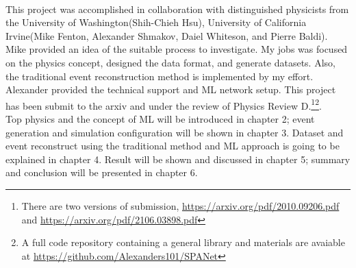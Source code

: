 \\
This project was accomplished in collaboration with distinguished physicists from the University of Washington(Shih-Chieh Hsu), University of California Irvine(Mike Fenton, Alexander Shmakov, Daiel Whiteson, and Pierre Baldi). Mike provided an idea of the suitable process to investigate.  My jobs was focused on the physics concept, designed the data format, and generate datasets. Also, the traditional event reconstruction method is implemented by my effort. Alexander provided the technical support and ML network setup. This project has been submit to the arxiv and under the review of Physics Review D.\footnote{There are two versions of submission, \hyperlink{https://arxiv.org/pdf/2010.09206.pdf}{https://arxiv.org/pdf/2010.09206.pdf} and \hyperlink{https://arxiv.org/pdf/2106.03898.pdf}{https://arxiv.org/pdf/2106.03898.pdf}}\footnote{A full code repository containing a general library and materials are avaiable at \hyperlink{https://github.com/Alexanders101/SPANet}{https://github.com/Alexanders101/SPANet}}.
\\
Top physics and the concept of ML will be introduced in chapter 2; event generation and simulation configuration will be shown in chapter 3. Dataset and event reconstruct using the traditional method and ML approach is going to be explained in chapter 4. Result will be shown and discussed in chapter 5; summary and conclusion will be presented in chapter 6.


